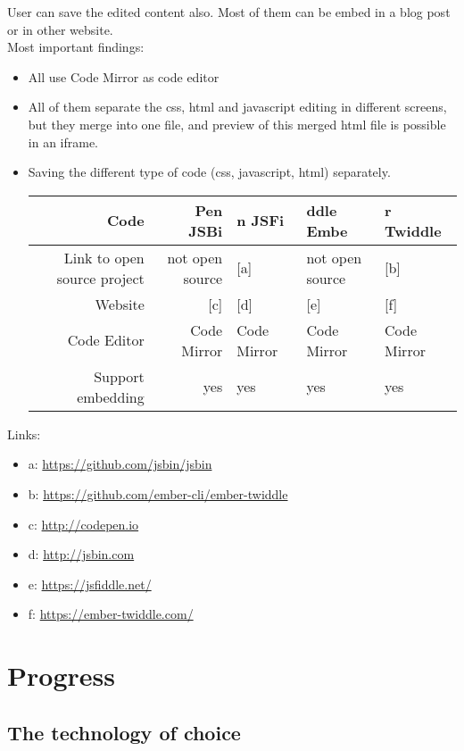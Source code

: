 User can save the edited content also. Most of them can be embed in a
blog post or in other website.\\
Most important findings:

\begin{itemize}
\item
  All use Code Mirror as code editor
\item
  All of them separate the css, html and javascript editing in different
  screens, but they merge into one file, and preview of this merged html
  file is possible in an iframe.
\item
  Saving the different type of code (css, javascript, html) separately.

  \begin{longtable}[]{@{}rrlll@{}}
  \toprule
  Code & Pen JSBi & n JSFi & ddle Embe & r Twiddle\tabularnewline
  \midrule
  \endhead
  Link to open source project & not open source & {[}a{]} & not open
  source & {[}b{]}\tabularnewline
  Website & {[}c{]} & {[}d{]} & {[}e{]} & {[}f{]}\tabularnewline
  Code Editor & Code Mirror & Code Mirror & Code Mirror & Code
  Mirror\tabularnewline
  Support embedding & yes & yes & yes & yes\tabularnewline
  \bottomrule
  \end{longtable}
\end{itemize}

Links:

\begin{itemize}
\tightlist
\item
  a: \url{https://github.com/jsbin/jsbin}\\
\item
  b: \url{https://github.com/ember-cli/ember-twiddle}\\
\item
  c: \url{http://codepen.io}\\
\item
  d: \url{http://jsbin.com}\\
\item
  e: \url{https://jsfiddle.net/}\\
\item
  f: \url{https://ember-twiddle.com/}\\
\end{itemize}

\section{Progress}\label{progress}

\subsection{The technology of choice}\label{the-technology-of-choice}

